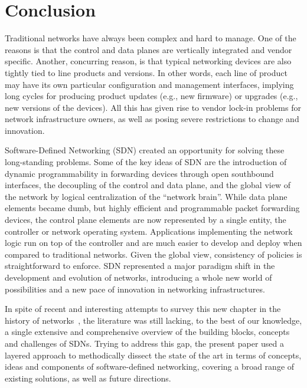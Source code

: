 \section{Conclusion}

Traditional networks have always been complex and hard to manage.  One
of the reasons is that the control and data planes are vertically
integrated and vendor specific. Another, concurring reason, is that
typical networking devices are also tightly tied to line products and
versions.  In other words, each line of product may have its own
particular configuration and management interfaces, implying long
cycles for producing product updates (e.g., new firmware) or upgrades
(e.g., new versions of the devices). All this has given rise to vendor
lock-in problems for network infrastructure owners, as well as posing
severe restrictions to change and innovation.

Software-Defined Networking (SDN) created an opportunity for solving
these long-standing problems.  Some of the key ideas of SDN are the
introduction of dynamic programmability in forwarding devices through
open southbound interfaces, the decoupling of the control and data
plane, and the global view of the network by logical centralization of
the ``network brain''.  While data plane elements became dumb, but
highly efficient and programmable packet forwarding devices, the
control plane elements are now represented by a single entity, the
controller or network operating system.  Applications implementing the
network logic run on top of the controller and are much easier to
develop and deploy when compared to traditional networks. Given the
global view, consistency of policies is straightforward to enforce.
SDN represented a major paradigm shift in the development and
evolution of networks, introducing a whole new world of possibilities
and a new pace of innovation in networking infrastructures.

In spite of recent and interesting attempts to survey this new chapter
in the history of networks~\cite{lara2014,jarraya2014,nunes2014}, the
literature was still lacking, to the best of our knowledge, a single
extensive and comprehensive overview of the building blocks, concepts
and challenges of SDNs.
%
%
Trying to address this gap, the present paper used a layered approach
to methodically dissect the state of the art in terms of concepts,
ideas and components of software-defined networking, covering a broad
range of existing solutions, as well as future directions.


